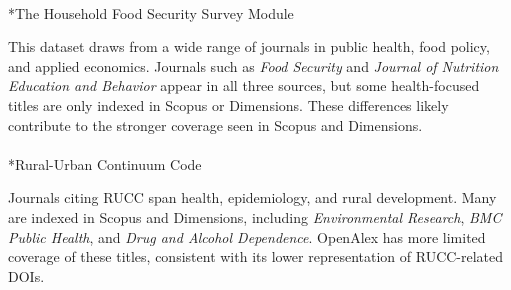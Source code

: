 \documentclass[
  letterpaper,
  DIV=11,
  numbers=noendperiod]{scrartcl}
\makeatletter
\let\oldparagraph\paragraph
\renewcommand{\paragraph}{
    \@ifstar
      \xxxParagraphStar
      \xxxParagraphNoStar
  }
\newcommand{\xxxParagraphStar}[1]{\oldparagraph*{#1}\mbox{}}
\newcommand{\xxxParagraphNoStar}[1]{\oldparagraph{#1}\mbox{}}
\makeatother
\begin{document}
\paragraph*{The Household Food Security Survey
Module}\label{the-household-food-security-survey-module-1}

This dataset draws from a wide range of journals in public health, food
policy, and applied economics. Journals such as \emph{Food Security} and
\emph{Journal of Nutrition Education and Behavior} appear in all three
sources, but some health-focused titles are only indexed in Scopus or
Dimensions. These differences likely contribute to the stronger coverage
seen in Scopus and Dimensions.

\paragraph*{Rural-Urban Continuum
Code}\label{rural-urban-continuum-code-1}

Journals citing RUCC span health, epidemiology, and rural development.
Many are indexed in Scopus and Dimensions, including \emph{Environmental
Research}, \emph{BMC Public Health}, and \emph{Drug and Alcohol
Dependence}. OpenAlex has more limited coverage of these titles,
consistent with its lower representation of RUCC-related DOIs.
\end{document}
